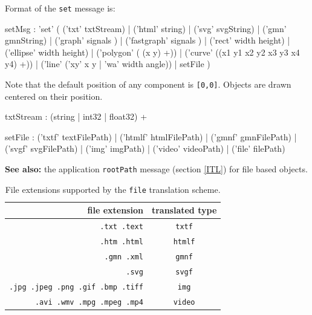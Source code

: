 \documentclass[a4paper,twoside]{report}
\newcommand{\OSC}[1]		{\texttt{#1}}
\newcommand{\values}[1]	{\texttt{#1}}
\renewcommand{\seealso}	{\textbf{See also: }}
\begin{document}
Format of the \OSC{set} message is:
\begin{rail}
setMsg : 'set' (
	('txt' txtStream) |
	('html' string) |
	('svg' svgString) |
	('gmn' gmnString) |
	('graph' signals ) |
	('fastgraph' signals ) |
	('rect' width height) |
	('ellipse' width height) |
	('polygon' ( (x y) +)) |
	('curve' ((x1 y1 x2 y2 x3 y3 x4 y4) +)) |
	('line' ('xy' x y | 'wa' width angle)) |
	setFile
)
\end{rail}

Note that the default position of any component is \values{[0,0]}. Objects are drawn centered on their position.

\begin{rail}
txtStream :  (string | int32 | float32) +
\end{rail}

\label{setfile}
\begin{rail}
setFile : 
	('txtf' textFilePath) |
	('htmlf' htmlFilePath) |
	('gmnf' gmnFilePath) |
	('svgf' svgFilePath) |
	('img' imgPath) |
	('video' videoPath) |
	('file' filePath)
\end{rail}

\seealso the application \OSC{rootPath} message (section \ref{ITL}) for file based objects.

\begin{table}[htdp]
\caption{File extensions supported by the \OSC{file} translation scheme.}
\begin{center}
\begin{tabular}{|r|c|}
\hline
file extension & translated type \\
\hline
\OSC{.txt .text}		& \OSC{txtf} \\
\OSC{.htm .html}		& \OSC{htmlf} \\
\OSC{.gmn .xml}		& \OSC{gmnf} \\
\OSC{.svg} 			& \OSC{svgf} \\
\OSC{.jpg .jpeg .png .gif .bmp .tiff} & \OSC{img} \\
\OSC{.avi .wmv .mpg .mpeg .mp4} & \OSC{video} \\
\hline
\end{tabular}
\end{center}
\label{fileTranslate}
\end{table}
\end{document}
